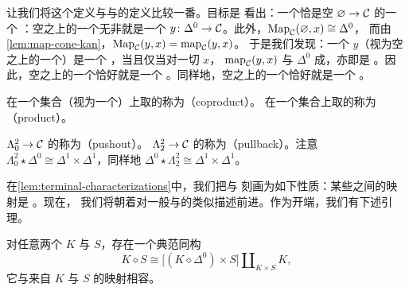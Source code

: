 \begin{remark}\label{rem:initial-terminal-as-colimits}
让我们将这个定义与\trInitialObject{}与\trTerminalObject{}的定义比较一番。目标是
看出：一个\trInitialObject{}恰是空\trFunctor{} $\varnothing \to \mathcal{C}$ 的一个%
\trColimit{}：空\trFunctor{}之上的一个\trCone{}无非就是一个\trFunctor{}%
$y\colon \Delta^0 \to \mathcal{C}$。此外，$\mathrm{Map}_{\mathcal{C}}(\varnothing, x) \cong \Delta^0$，
而由\cref{lem:map-cone-kan}，$\mathrm{Map}_{\mathcal{C}}(y, x) = \mathrm{map}_{\mathcal{C}}(y, x)$。
于是我们发现：一个\trObject{} $y$（视为空\trFunctor{}之上的一个\trCone{}）是一个%
\trColimit{}\trCone{}，当且仅当对一切\trObject{} $x$，\trMappingSpace{}%
$\mathrm{map}_{\mathcal{C}}(y, x)$ 与 $\Delta^0$ 成\trJoyalEquivalence{}，亦即是%
\trContractible{}。因此，空\trFunctor{}之上的一个\trColimit{}\trCone{}恰好就是一个%
\trInitialObject{}。同样地，空\trFunctor{}之上的一个\trLimit{}\trCocone{}恰好就是一个%
\trTerminalObject{}。
\end{remark}

\begin{example*}
在一个集合（视为一个\trDiscreteCategory{}）上取的\trColimit{}称为\emph{\trCoproduct{}}（coproduct）。
在一个集合上取的\trLimit{}称为\emph{\trProduct{}}（product）。
\end{example*}

\begin{example*}
$\Lambda^2_0 \to \mathcal{C}$ 的\trColimit{}称为\emph{\trPushout{}}（pushout）。
$\Lambda^2_2 \to \mathcal{C}$ 的\trLimit{}称为\emph{\trPullback{}}（pullback）。注意
$\Lambda^2_0 \star \Delta^0 \cong \Delta^1 \times \Delta^1$，同样地
$\Delta^0 \star \Lambda^2_2 \cong \Delta^1 \times \Delta^1$。
\end{example*}

在\cref{lem:terminal-characterizations}中，我们把\trInitialObject{}与%
\trTerminalObject{}刻画为如下性质：某些\trSlice{}之间的映射是%
\trTrivialFibration{}。现在，
我们将朝着对一般\trColimit{}与\trLimit{}的类似描述前进。作为开端，我们有下述引理。

\begin{lemma}\label{lem:fat-join-iso}
对任意两个\trSimplicialSets{} $K$ 与 $S$，存在一个典范同构
\[
K \diamond S \cong \bigl[(K \diamond \Delta^0) \times S\bigr]
  \amalg_{K \times S} K,
\]
它与来自 $K$ 与 $S$ 的映射相容。
\end{lemma}

